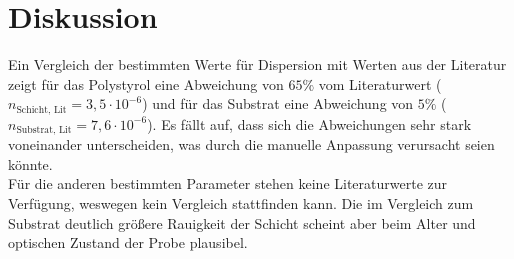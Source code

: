 \section{Diskussion}
Ein Vergleich der bestimmten Werte für Dispersion mit Werten aus der Literatur zeigt für das Polystyrol
eine Abweichung von $65\%$ vom Literaturwert ($n_\text{Schicht, Lit}=3{,}5\cdot10^{-6}$\cite{anleitung}) und für das Substrat eine Abweichung von $5\%$ ($n_\text{Substrat, Lit}=7{,}6\cdot10^{-6}$\cite{anleitung}). Es fällt auf, dass sich die Abweichungen sehr stark voneinander unterscheiden, was durch die manuelle Anpassung verursacht seien könnte.\\ Für die anderen bestimmten Parameter stehen keine Literaturwerte zur Verfügung, weswegen kein Vergleich stattfinden kann. Die im Vergleich zum Substrat deutlich größere Rauigkeit der Schicht scheint aber beim Alter und optischen Zustand der Probe plausibel.
